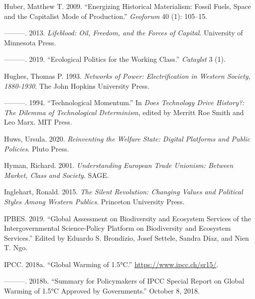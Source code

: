 \documentclass[a4paper, nobind]{templates/ociamthesis}
\newlength{\cslhangindent}
\newenvironment{CSLReferences}[2] %
 {%
  \setlength{\parindent}{0pt}
  \ifodd #1
  \let\oldpar\par
  \def\par{\hangindent=\cslhangindent\oldpar}
  \fi
  \setlength{\parskip}{1mm}
  \setlength{\baselineskip}{6mm}
 }%
 {}
\begin{document}
\begin{CSLReferences}{1}{0}
\leavevmode{}%
Huber, Matthew T. 2009. {``Energizing Historical Materialism: {Fossil} Fuels, Space and the Capitalist Mode of Production.''} \emph{Geoforum} 40 (1): 105--15.

\leavevmode{}%
---------. 2013. \emph{Lifeblood: {Oil}, {Freedom}, and the {Forces} of {Capital}}. {University of Minnesota Press}.

\leavevmode{}%
---------. 2019. {``Ecological {Politics} for the {Working Class}.''} \emph{Cataylst} 3 (1).

\leavevmode{}%
Hughes, Thomas P. 1993. \emph{Networks of {Power}: {Electrification} in {Western Society}, 1880-1930}. {The John Hopkins University Press}.

\leavevmode{}%
---------. 1994. {``Technological {Momentum}.''} In \emph{Does {Technology Drive History}?: {The Dilemma} of {Technological Determinism}}, edited by Merritt Roe Smith and Leo Marx. {MIT Press}.

\leavevmode{}%
Huws, Ursula. 2020. \emph{Reinventing the {Welfare State}: {Digital Platforms} and {Public Policies}}. {Pluto Press}.

\leavevmode{}%
Hyman, Richard. 2001. \emph{Understanding {European Trade Unionism}: {Between Market}, {Class} and {Society}}. {SAGE}.

\leavevmode{}%
Inglehart, Ronald. 2015. \emph{The {Silent Revolution}: {Changing Values} and {Political Styles Among Western Publics}}. {Princeton University Press}.

\leavevmode{}%
IPBES. 2019. {``Global {Assessment} on {Biodiversity} and {Ecosystem Services} of the {Intergovernmental Science-Policy Platform} on {Biodiversity} and {Ecosystem Services}.''} Edited by Eduardo S. Brondizio, Josef Settele, Sandra Díaz, and Nien T. Ngo.

\leavevmode{}%
IPCC. 2018a. {``Global {Warming} of 1.5°{C}.''} \url{https://www.ipcc.ch/sr15/}.

\leavevmode{}%
---------. 2018b. {``Summary for {Policymakers} of {IPCC Special Report} on {Global Warming} of 1.5°{C} Approved by Governments.''} October 8, 2018.


\end{CSLReferences}
\end{document}
